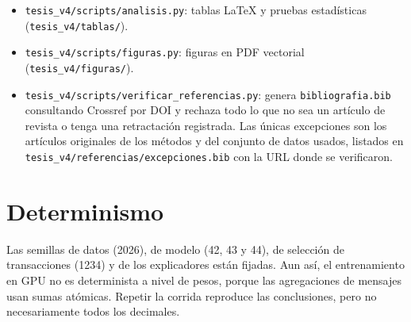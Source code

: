 \begin{itemize}
  \item \texttt{tesis\_v4/scripts/analisis.py}: tablas \LaTeX{} y pruebas estadísticas
        (\texttt{tesis\_v4/tablas/}).
  \item \texttt{tesis\_v4/scripts/figuras.py}: figuras en PDF vectorial
        (\texttt{tesis\_v4/figuras/}).
  \item \texttt{tesis\_v4/scripts/verificar\_referencias.py}: genera
        \texttt{bibliografia.bib} consultando Crossref por DOI y rechaza todo lo que no sea un
        artículo de revista o tenga una retractación registrada. Las únicas excepciones son
        los artículos originales de los métodos y del conjunto de datos usados, listados en
        \texttt{tesis\_v4/referencias/excepciones.bib} con la URL donde se verificaron.
\end{itemize}

\section{Determinismo}

Las semillas de datos (2026), de modelo (42, 43 y 44), de selección de transacciones (1234) y de
los explicadores están fijadas. Aun así, el entrenamiento en GPU no es determinista a nivel de
pesos, porque las agregaciones de mensajes usan sumas atómicas. Repetir la corrida reproduce
las conclusiones, pero no necesariamente todos los decimales.
